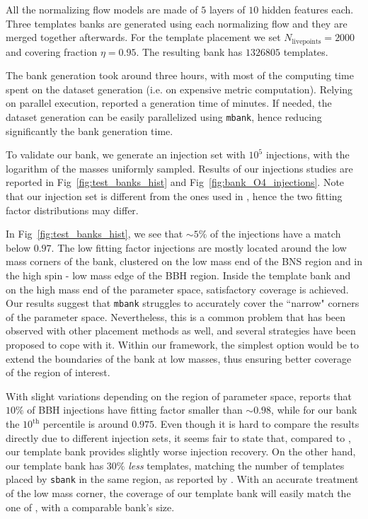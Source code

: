 \documentclass[twocolumn,showpacs,preprintnumbers,nofootinbib,prd,
superscriptaddress,10pt]{revtex4-2}
\begin{document}
All the normalizing flow models are made of $5$ layers of $10$ hidden features each.
Three templates banks are generated using each normalizing flow and they are merged together afterwards.
For the template placement we set $N_\text{livepoints} = 2000$ and covering fraction $\eta = 0.95$.
The resulting bank has $1326805$ templates.

The bank generation took around three hours, with most of the computing time spent on the dataset generation (i.e. on expensive metric computation).
Relying on parallel execution, \cite{Sakon:2022ibh} reported a generation time of minutes.
If needed, the dataset generation can be easily parallelized using \texttt{mbank}, hence reducing significantly the bank generation time.

To validate our bank, we generate an injection set with $10^5$ injections, with the logarithm of the masses uniformly sampled.
Results of our injections studies are reported in Fig~\ref{fig:test_banks_hist} and Fig~\ref{fig:bank_O4_injections}.
Note that our injection set is different from the ones used in \cite{Sakon:2022ibh}, hence the two fitting factor distributions may differ.

In Fig~\ref{fig:test_banks_hist}, we see that $\sim 5\%$ of the injections have a match below $0.97$. The low fitting factor injections are mostly located around the low mass corners of the bank, clustered on the low mass end of the BNS region and in the high spin - low mass edge of the BBH region.
Inside the template bank and on the high mass end of the parameter space, satisfactory coverage is achieved.
Our results suggest that \texttt{mbank} struggles to accurately cover the ``narrow" corners of the parameter space. Nevertheless, this is a common problem that has been observed with other placement methods as well, and several strategies have been proposed to cope with it. Within our framework, the simplest option would be to extend the boundaries of the bank at low masses, thus ensuring better coverage of the region of interest.

With slight variations depending on the region of parameter space, \cite{Sakon:2022ibh} reports that $10\%$ of BBH injections have fitting factor smaller than $\sim 0.98$, while for our bank the $10^\text{th}$ percentile is around $0.975$.
Even though it is hard to compare the results directly due to different injection sets, it seems fair to state that, compared to \cite{Sakon:2022ibh}, our template bank provides slightly worse injection recovery.
On the other hand, our template bank has $30\%$ {\it less} templates, matching the number of templates placed by \texttt{sbank} in the same region, as reported by \cite{Sakon:2022ibh}. With an accurate treatment of the low mass corner, the coverage of our template bank will easily match the one of \cite{Sakon:2022ibh}, with a comparable bank's size.
\end{document}
